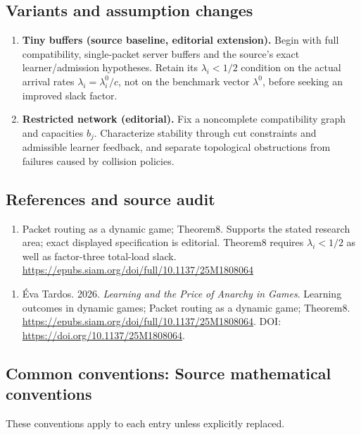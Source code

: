 \documentclass[11pt,a4paper]{article}
\begin{document}
\subsection*{Variants and assumption changes}
\begin{enumerate}
\item \textbf{Tiny buffers (source baseline, editorial extension).} Begin with full compatibility, single-packet server buffers and the source’s exact learner/admission hypotheses. Retain its \(\lambda_i<1/2\) condition on the actual arrival rates \(\lambda_i=\lambda_i^0/c\), not on the benchmark vector \(\lambda^0\), before seeking an improved slack factor.
\item \textbf{Restricted network (editorial).} Fix a noncomplete compatibility graph and capacities \(b_j\). Characterize stability through cut constraints and admissible learner feedback, and separate topological obstructions from failures caused by collision policies.
\end{enumerate}
\subsection*{References and source audit}
\begin{enumerate}
\item Packet routing as a dynamic game; Theorem8. Supports the stated research area; exact displayed specification is editorial. Theorem8 requires \(\lambda_i<1/2\) as well as factor-three total-load slack. \url{https://epubs.siam.org/doi/full/10.1137/25M1808064}
\end{enumerate}
\begin{enumerate}\raggedright
\item\hypertarget{definitions:source:30007568:1}{} Éva Tardos. 2026. \emph{Learning and the Price of Anarchy in Games}. Learning outcomes in dynamic games; Packet routing as a dynamic game; Theorem8.
\url{https://epubs.siam.org/doi/full/10.1137/25M1808064}.
DOI: \url{https://doi.org/10.1137/25M1808064}.
\end{enumerate}

\subsection*{Common conventions: Source mathematical conventions}

These conventions apply to each entry unless explicitly replaced.
\end{document}
